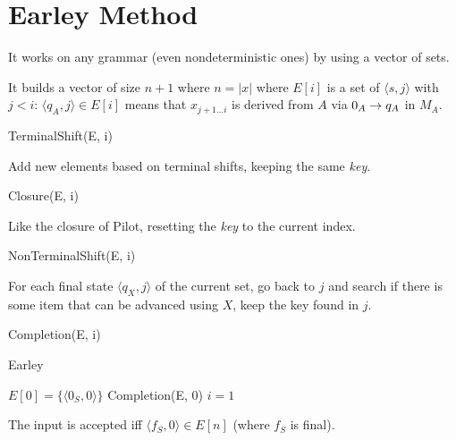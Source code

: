 \section{Earley Method}

It works on any grammar (even nondeterministic ones) by using a vector of sets.

It builds a vector of size $n+1$ where $n=|x|$ where $E[i]$ is a set of $\langle s,j \rangle$ with $j<i$: $\langle q_A,j \rangle \in E[i]$ means that $x_{j+1\ldots i}$ is derived from $A$ via $0_A\rightarrow q_A$ in $M_A$.

\begin{algorithm*}[H]
    \caption{TerminalShift(E, i)}
    \SetAlgoLined
\end{algorithm*}
Add new elements based on terminal shifts, keeping the same \emph{key}.

\begin{algorithm*}[H]
    \caption{Closure(E, i)}
    \SetAlgoLined
\end{algorithm*}
Like the closure of Pilot, resetting the \emph{key} to the current index.

\begin{algorithm*}[H]
    \caption{NonTerminalShift(E, i)}
    \SetAlgoLined
\end{algorithm*}
For each final state $\langle q_X,j \rangle$ of the current set, go back to $j$ and search if there is some item that can be advanced using $X$, keep the key found in $j$.

\begin{algorithm*}[H]
    \caption{Completion(E, i)}
    \SetAlgoLined
\end{algorithm*}

\begin{algorithm*}[H]
    \caption{Earley}
    \SetAlgoLined
    $E[0] = \{\langle 0_S, 0 \rangle \}$\;
    Completion(E, 0)\;
    $i = 1$\;
\end{algorithm*}

The input is accepted iff $\langle f_S, 0 \rangle \in E[n]$ (where $f_S$ is final).
